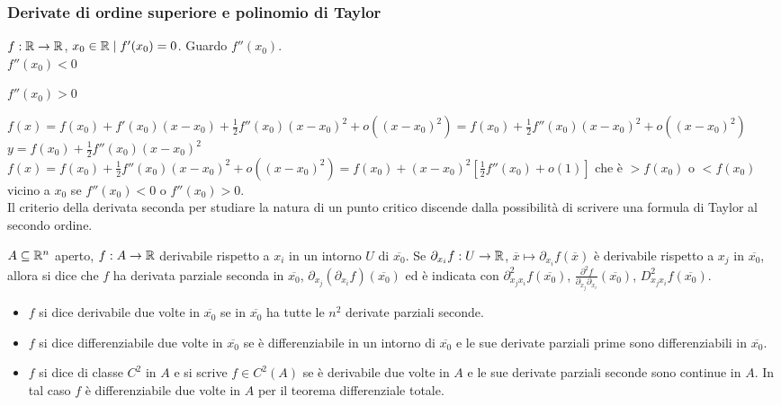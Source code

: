 \subsubsection{Derivate di ordine superiore e polinomio di Taylor}

$f: \mathbb{R} \rightarrow \mathbb{R}$, $x_0\in\mathbb{R} \mid f'(x_0)=0$. Guardo $f''(x_0)$.\\ 
$f''(x_0)<0$ 

\segnaposto %

$f''(x_0)>0$ 

\segnaposto %

$f(x)=f(x_0)+f'(x_0)(x-x_0)+\frac{1}{2}f''(x_0)(x-x_0)^2+o((x-x_0)^2)=f(x_0)+\frac{1}{2}f''(x_0)(x-x_0)^2+o((x-x_0)^2)$\\
$y=f(x_0)+\frac{1}{2}f''(x_0)(x-x_0)^2$\\
$f(x)=f(x_0)+\frac{1}{2}f''(x_0)(x-x_0)^2+o((x-x_0)^2)=f(x_0)+(x-x_0)^2\left[ \frac{1}{2} f''(x_0)+o(1) \right]$ che è $> f(x_0)$ o $< f(x_0)$ vicino a $x_0$ se $f''(x_0)< 0$ o $f''(x_0)>0$.\\
Il criterio della derivata seconda per studiare la natura di un punto critico discende dalla possibilità di scrivere una formula di Taylor al secondo ordine.


\begin{definition}
	$A \subseteq \mathbb{R}^n$ aperto, $f: A \rightarrow \mathbb{R}$ derivabile rispetto a $x_i$ in un intorno $U$ di $\overline{x_0}$. Se $\partial_{x_i}f:U\rightarrow \mathbb{R}$, $\overline{x} \mapsto \partial_{x_i}f(\overline{x})$ è derivabile rispetto a $x_j$ in $\overline{x_0}$, allora si dice che $f$ ha derivata parziale seconda in $\overline{x_0}$, $\partial_{x_j}(\partial_{x_i}f)(\overline{x_0})$ ed è indicata con $\partial_{x_jx_i}^2f(\overline{x_0})$, $ \frac{\partial^2 f}{\partial_{x_j}\partial_{x_i}}(\overline{x_0})$, $D_{x_jx_i}^2f(\overline{x_0})$.
	\begin{itemize}
		\item $f$ si dice derivabile due volte in $\overline{x_0} $ se in $\overline{x_0}$ ha tutte le $n^2$ derivate parziali seconde.
		\item $f$ si dice differenziabile due volte in $\overline{x_0}$ se è differenziabile in un intorno di $\overline{x_0}$ e le sue derivate parziali prime sono differenziabili in $\overline{x_0}$.
		\item $f$ si dice di classe $C^2$ in $A$ e si scrive $f \in C^2(A)$ se è derivabile due volte in $A$ e le sue derivate parziali seconde sono continue in $A$. In tal caso $f$ è differenziabile due volte in $A$ per il teorema differenziale totale. 
	\end{itemize}
\end{definition}


